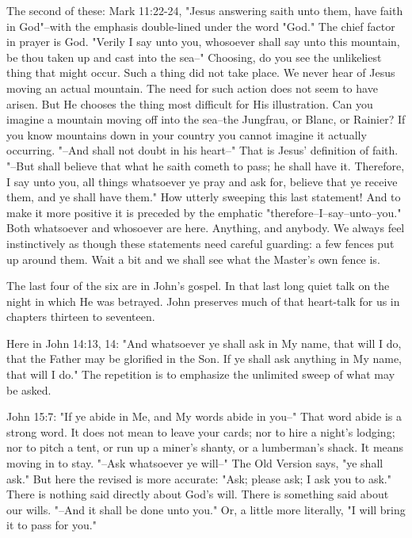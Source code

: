 The second of these: Mark 11:22-24, "Jesus answering saith unto them, have
faith in God"--with the emphasis double-lined under the word "God." The
chief factor in prayer is God. "Verily I say unto you, whosoever shall say
unto this mountain, be thou taken up and cast into the sea--" Choosing, do
you see the unlikeliest thing that might occur. Such a thing did not take
place. We never hear of Jesus moving an actual mountain. The need for such
action does not seem to have arisen. But He chooses the thing most
difficult for His illustration. Can you imagine a mountain moving off into
the sea--the Jungfrau, or Blanc, or Rainier? If you know mountains down in
your country you cannot imagine it actually occurring. "--And shall not
doubt in his heart--" That is Jesus' definition of faith. "--But shall
believe that what he saith cometh to pass; he shall have it. Therefore, I
say unto you, all things whatsoever ye pray and ask for, believe that ye
receive them, and ye shall have them." How utterly sweeping this last
statement! And to make it more positive it is preceded by the emphatic
"therefore--I--say--unto--you." Both whatsoever and whosoever are here.
Anything, and anybody. We always feel instinctively as though these
statements need careful guarding: a few fences put up around them. Wait a
bit and we shall see what the Master's own fence is.

The last four of the six are in John's gospel. In that last long quiet
talk on the night in which He was betrayed. John preserves much of that
heart-talk for us in chapters thirteen to seventeen.

Here in John 14:13, 14: "And whatsoever ye shall ask in My name, that will
I do, that the Father may be glorified in the Son. If ye shall ask
anything in My name, that will I do." The repetition is to emphasize the
unlimited sweep of what may be asked.

John 15:7: "If ye abide in Me, and My words abide in you--" That word
abide is a strong word. It does not mean to leave your cards; nor to hire
a night's lodging; nor to pitch a tent, or run up a miner's shanty, or a
lumberman's shack. It means moving in to stay. "--Ask whatsoever ye
will--" The Old Version says, "ye shall ask." But here the revised is more
accurate: "Ask; please ask; I ask you to ask." There is nothing said
directly about God's will. There is something said about our wills. "--And
it shall be done unto you." Or, a little more literally, "I will bring it
to pass for you."

